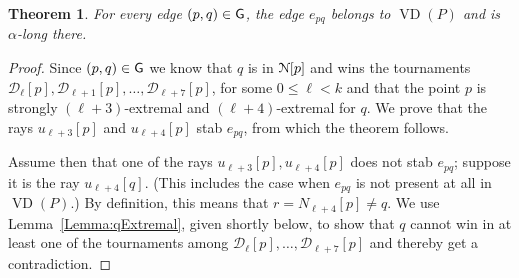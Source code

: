 \documentclass[letter,11pt]{article}
\newtheorem{theorem}{Theorem}[section]
\def\NN{\EuScript{N}}
\def\dirtour{{\mathcal D}}
\def\G{{\sf G}}
\def\VD{\mathop{\mathrm{VD}}}
\begin{document}
\begin{theorem}\label{Thm:Soundness}
For every edge $(p,q)\in \G$, the edge $e_{pq}$ belongs to $\VD(P)$ and is $\alpha$-long there.
\end{theorem}
\begin{proof}


Since $(p,q)\in \G$ we know that $q$ is in $\NN[p]$ and wins the tournaments
$\dirtour_\ell[p],\dirtour_{\ell+1}[p],\ldots,\dirtour_{\ell+7}[p]$, for some $0\leq \ell <k$ and
that the point $p$ is strongly $(\ell+3)$-extremal and $(\ell+4)$-extremal for $q$. 
We prove that the rays $u_{\ell+3}[p]$ and $u_{\ell+4}[p]$ stab $e_{pq}$,
from which the theorem follows.

Assume then that
 one of the rays $u_{\ell+3}[p], u_{\ell+4}[p]$ does not stab
 $e_{pq}$; suppose it is the ray $u_{\ell+4}[q]$. (This includes the case when $e_{pq}$ is not present at
 all in $\VD(P)$.)  By definition, this means that
 $r=N_{\ell+4}[p]\neq q$. We use Lemma~\ref{Lemma:qExtremal}, given shortly below, to show that
 $q$ cannot win in at least one of the tournaments among
 $\dirtour_{\ell}[p],\ldots,\dirtour_{\ell+7}[p]$ and thereby get a
 contradiction.



\end{proof}
\end{document}
